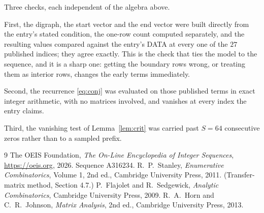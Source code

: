 \documentclass[11pt,a4paper]{article}
\theoremstyle{plain}
\theoremstyle{definition}
\begin{document}
Three checks, each independent of the algebra above.

First, the digraph, the start vector and the end vector were built directly from the
entry's stated condition, the one-row count computed separately, and the resulting values
compared against the entry's DATA at every one of the $27$ published indices; they
agree exactly. This is the check that ties the model to the sequence, and it is a sharp one:
getting the boundary rows wrong, or treating them as interior rows, changes the early terms
immediately.

Second, the recurrence \eqref{eq:conj} was evaluated on those published terms in exact
integer arithmetic, with no matrices involved, and vanishes at every index the entry claims.

Third, the vanishing test of Lemma~\ref{lem:crit} was carried past $S=64$ consecutive
zeros rather than to a sampled prefix.

\begin{thebibliography}{9}
 The OEIS Foundation, \emph{The On-Line Encyclopedia of Integer
Sequences}, \url{https://oeis.org}, 2026. Sequence A316234.
 R.~P.~Stanley, \emph{Enumerative Combinatorics}, Volume 1, 2nd ed.,
Cambridge University Press, 2011. (Transfer-matrix method, Section 4.7.)
 P.~Flajolet and R.~Sedgewick, \emph{Analytic Combinatorics}, Cambridge
University Press, 2009.
 R.~A.~Horn and C.~R.~Johnson, \emph{Matrix Analysis}, 2nd ed., Cambridge
University Press, 2013.
\end{thebibliography}
\end{document}
